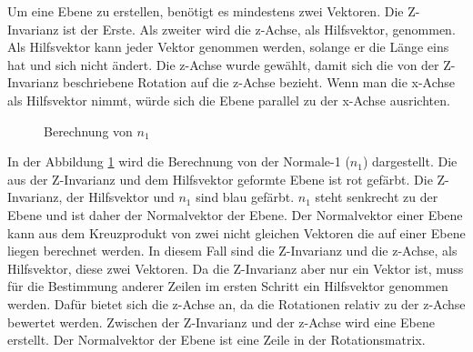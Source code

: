 \smallskip

Um eine Ebene zu erstellen, benötigt es mindestens zwei Vektoren. Die Z-Invarianz ist der Erste. Als zweiter wird die z-Achse, als Hilfsvektor, genommen. Als Hilfsvektor kann jeder Vektor genommen werden, solange er die Länge eins hat und sich nicht ändert.
Die z-Achse wurde gewählt, damit sich die von der Z-Invarianz beschriebene Rotation auf die z-Achse bezieht. Wenn man die x-Achse als Hilfsvektor nimmt, würde sich die Ebene parallel zu der x-Achse ausrichten.

    \begin{figure}[t]
        \centering
        \caption[Berechnung von $n_1$]{Berechnung von $n_1$}
            \label{n1}
    \end{figure}

In der Abbildung \ref{n1} wird die Berechnung von der Normale-1 ($n_1$) dargestellt. Die aus der Z-Invarianz und dem Hilfsvektor geformte Ebene ist rot gefärbt. Die Z-Invarianz, der Hilfsvektor und $n_1$ sind blau gefärbt.
$n_1$ steht senkrecht zu der Ebene und ist daher der Normalvektor der Ebene. Der Normalvektor einer Ebene kann aus dem Kreuzprodukt von zwei nicht gleichen Vektoren die auf einer Ebene liegen berechnet werden. 
In diesem Fall sind die Z-Invarianz und die z-Achse, als Hilfsvektor, diese zwei Vektoren.
Da die Z-Invarianz aber nur ein Vektor ist, muss für die Bestimmung anderer Zeilen im ersten Schritt ein Hilfsvektor genommen werden. Dafür bietet sich die z-Achse an, da die Rotationen relativ zu der z-Achse bewertet werden.
Zwischen der Z-Invarianz und der z-Achse wird eine Ebene erstellt. Der Normalvektor der Ebene ist eine Zeile in der Rotationsmatrix.

